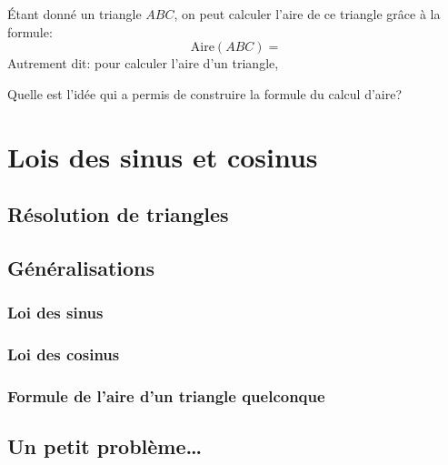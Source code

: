 \documentclass[
  a4paper,
  oneside]{book}
\begin{document}
\begin{generalisation}
Étant donné un triangle \(ABC\), on peut calculer l'aire de ce triangle
grâce à la formule: \[
  \text{Aire}(ABC)=
\] Autrement dit: pour calculer l'aire d'un triangle, \vspace{2cm}

\end{generalisation}

\begin{observation}
Quelle est l'idée qui a permis de construire la formule du calcul
d'aire? \vspace{4cm}

\end{observation}

\chapter{Lois des sinus et cosinus}\label{lois-des-sinus-et-cosinus}

\section{Résolution de triangles}\label{ruxe9solution-de-triangles}

\section{Généralisations}\label{guxe9nuxe9ralisations}

\subsection{Loi des sinus}\label{loi-des-sinus}

\subsection{Loi des cosinus}\label{loi-des-cosinus}

\subsection{Formule de l'aire d'un triangle
quelconque}\label{formule-de-laire-dun-triangle-quelconque}

\section{Un petit problème\ldots{}}\label{un-petit-probluxe8me}
\end{document}
